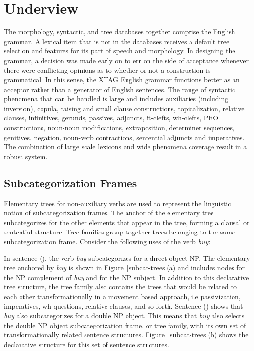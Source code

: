 \chapter{Underview}
\label{underview}

The morphology, syntactic, and tree databases together comprise the English
grammar.  A lexical item that is not in the databases receives a default tree
selection and features for its part of speech and morphology.  In designing the
grammar, a decision was made early on to err on the side of acceptance whenever
there were conflicting opinions as to whether or not a construction is
grammatical.  In this sense, the XTAG English grammar functions better as an
acceptor rather than a generator of English sentences.  The range of syntactic
phenomena that can be handled is large and includes auxiliaries (including
inversion), copula, raising and small clause constructions, topicalization,
relative clauses, infinitives, gerunds, passives, adjuncts, it-clefts,
wh-clefts, PRO constructions, noun-noun modifications, extraposition,
determiner sequences, genitives, negation, noun-verb contractions, sentential
adjuncts and imperatives.  The combination of large scale lexicons and wide
phenomena coverage result in a robust system.


\section{Subcategorization Frames}
\label{subcat-frames}

Elementary trees for non-auxiliary verbs are used to represent the linguistic
notion of subcategorization frames.  The anchor of the elementary tree
subcategorizes for the other elements that appear in the tree, forming a
clausal or sentential structure.  Tree families group together trees belonging
to the same subcategorization frame.  Consider the following uses of the verb
{\it buy}:


In sentence (), the verb {\it buy} subcategorizes for a direct object NP.
The elementary tree anchored by {\it buy} is shown in
Figure~\ref{subcat-trees}(a) and includes nodes for the NP complement of {\it
buy} and for the NP subject.  In addition to this declarative tree structure,
the tree family also contains the trees that would be related to each other
transformationally in a movement based approach, i.e passivization,
imperatives, wh-questions, relative clauses, and so forth.  Sentence ()
shows that {\it buy} also subcategorizes for a double NP object.  This means
that {\it buy} also selects the double NP object subcategorization frame, or
tree family, with its own set of transformationally related sentence
structures.  Figure~\ref{subcat-trees}(b) shows the declarative structure for
this set of sentence structures.

